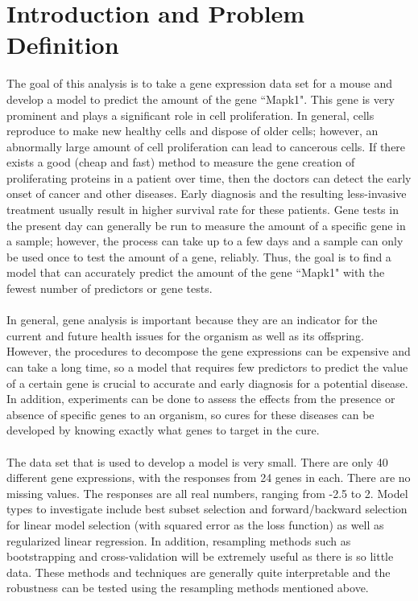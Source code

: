 \documentclass{article}
\begin{document}
\section{Introduction and Problem Definition}
The goal of this analysis is to take a gene expression data set for a mouse and develop a model to predict the amount of the gene ``Mapk1".  This gene is very prominent and plays a significant role in cell proliferation.  In general, cells reproduce to make new healthy cells and dispose of older cells; however, an abnormally large amount of cell proliferation can lead to cancerous cells.  If there exists a good (cheap and fast) method to measure the gene creation of proliferating proteins in a patient over time, then the doctors can detect the early onset of cancer and other diseases.  Early diagnosis and the resulting less-invasive treatment usually result in higher survival rate for these patients.  Gene tests in the present day can generally be run to measure the amount of a specific gene in a sample; however, the process can take up to a few days and a sample can only be used once to test the amount of a gene, reliably.  Thus, the goal is to find a model that can accurately predict the amount of the gene  ``Mapk1" with the fewest number of predictors or gene tests.\\
\null\\
%
In general, gene analysis is important because they are an indicator for the current and future health issues for the organism as well as its offspring.  However, the procedures to decompose the gene expressions can be expensive and can take a long time, so a model that requires few predictors to predict the value of a certain gene is crucial to accurate and early diagnosis for a potential disease.  In addition, experiments can be done to assess the effects from the presence or absence of specific genes to an organism, so cures for these diseases can be developed by knowing exactly what genes to target in the cure.\\
\null\\
%
The data set that is used to develop a model is very small.  There are only 40 different gene expressions, with the responses from 24 genes
in each.  There are no missing values.  The responses are all real numbers, ranging from -2.5 to 2.  Model types to investigate include best subset selection and forward/backward selection for linear model selection (with squared error as the loss function) as well as regularized linear regression.  In addition, resampling methods such as bootstrapping and cross-validation will be extremely useful as there is so little data.  These methods and techniques are generally quite interpretable and the robustness can be tested using the resampling methods mentioned above.\\
\end{document}
